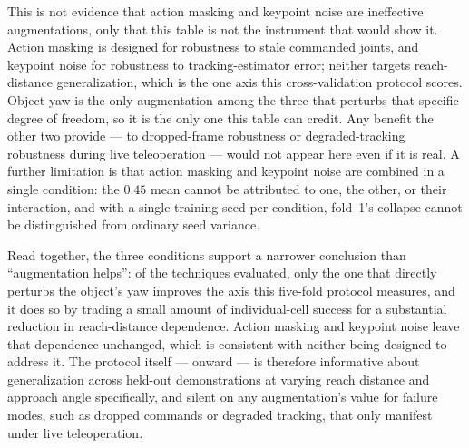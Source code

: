 This is not evidence that action masking and keypoint noise are ineffective augmentations, only that
this table is not the instrument that would show it. Action masking is designed for robustness to
stale commanded joints, and keypoint noise for robustness to tracking-estimator error; neither
targets reach-distance generalization, which is the one axis this cross-validation protocol scores.
Object yaw is the only augmentation among the three that perturbs that specific degree of freedom,
so it is the only one this table can credit. Any benefit the other two provide --- to dropped-frame
robustness or degraded-tracking robustness during live teleoperation --- would not appear here even
if it is real. A further limitation is that action masking and keypoint noise are combined in a
single condition: the $0.45$ mean cannot be attributed to one, the other, or their interaction, and
with a single training seed per condition, fold~1's collapse cannot be distinguished from ordinary
seed variance.

Read together, the three conditions support a narrower conclusion than ``augmentation helps'': of
the techniques evaluated, only the one that directly perturbs the object's yaw improves the axis
this five-fold protocol measures, and it does so by trading a small amount of individual-cell
success for a substantial reduction in reach-distance dependence. Action masking and keypoint noise
leave that dependence unchanged, which is consistent with neither being designed to address it. The
protocol itself ---  onward --- is therefore informative about
generalization across held-out demonstrations at varying reach distance and approach angle
specifically, and silent on any augmentation's value for failure modes, such as dropped commands or
degraded tracking, that only manifest under live teleoperation.
